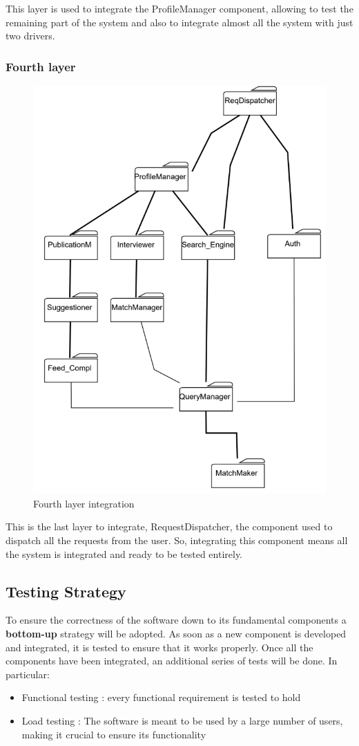 \documentclass{article}
\begin{document}
This layer is used to integrate the ProfileManager component, allowing to test the remaining part of the system and also to integrate almost all the system with just two drivers.

\subsubsection{Fourth layer}
\begin{figure}[H]
    \centering
    \includegraphics[width=0.5\linewidth]{Integration/FourthLayerIntegration.png}
    \caption{Fourth layer integration}
    \label{fig:enter-label}
\end{figure}
This is the last layer to integrate, RequestDispatcher, the component used to dispatch all the requests from the user. So, integrating this component means all the system is integrated and ready to be tested entirely.

\subsection{Testing Strategy}
To ensure the correctness of the software down to its fundamental components a \textbf{bottom-up} strategy will be adopted.
As soon as a new component is developed and integrated, it is tested to ensure that it works properly. Once all the components have been integrated, an additional series of tests will be done.
In particular:
\begin{itemize}
    \item Functional testing : every functional requirement is tested to hold 
    \item Load testing : The software is meant to be used by a large number of users, making it crucial to ensure its functionality 
\end{itemize}
\end{document}
